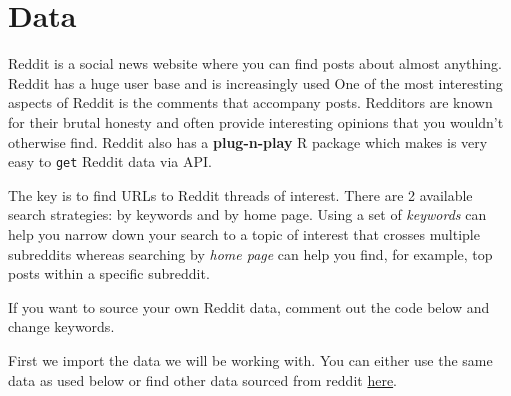 \documentclass[
  letterpaper,
  DIV=11,
  numbers=noendperiod]{scrreprt}
\newenvironment{Shaded}{\begin{snugshade}}{\end{snugshade}}
\newcommand{\CommentTok}[1]{\textcolor[rgb]{0.37,0.37,0.37}{#1}}
\begin{document}
\hypertarget{data-2}{%
\section{Data}\label{data-2}}

Reddit is a social news website where you can find posts about almost
anything. Reddit has a huge user base and is increasingly used One of
the most interesting aspects of Reddit is the comments that accompany
posts. Redditors are known for their brutal honesty and often provide
interesting opinions that you wouldn't otherwise find. Reddit also has a
\textbf{plug-n-play} R package which makes is very easy to \texttt{get}
Reddit data via API.

The key is to find URLs to Reddit threads of interest. There are 2
available search strategies: by keywords and by home page. Using a set
of \emph{keywords} can help you narrow down your search to a topic of
interest that crosses multiple subreddits whereas searching by
\emph{home page} can help you find, for example, top posts within a
specific subreddit.

If you want to source your own Reddit data, comment out the code below
and change keywords.

\begin{Shaded}
\end{Shaded}

First we import the data we will be working with. You can either use the
same data as used below or find other data sourced from reddit
\href{https://github.com/fcorowe/r4ps/tree/main/data/topic_modelling}{here}.
\end{document}
